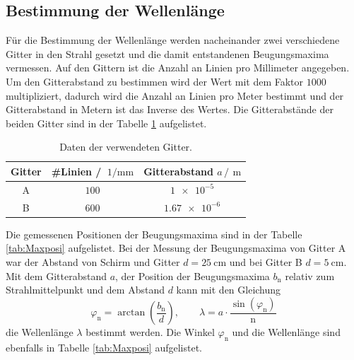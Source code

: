 \subsection{Bestimmung der Wellenlänge}
Für die Bestimmung der Wellenlänge werden nacheinander zwei verschiedene Gitter in den Strahl gesetzt und die damit entstandenen 
Beugungsmaxima vermessen.
Auf den Gittern ist die Anzahl an Linien pro Millimeter angegeben. Um den Gitterabstand zu bestimmen wird der Wert mit dem 
Faktor $\num{1000}$ multipliziert, dadurch wird die Anzahl an Linien pro Meter bestimmt und der Gitterabstand in Metern ist 
das Inverse des Wertes.
Die Gitterabstände der beiden Gitter sind in der Tabelle \ref{tab:Gitterabstand} aufgelistet.
\FloatBarrier
\begin{table}
  \centering
  \caption{Daten der verwendeten Gitter.}
  \label{tab:Gitterabstand}
  \begin{tabular}{c c c}
    \toprule
    Gitter&\#Linien / $\SI{}{1\per\milli\meter}$&Gitterabstand $a\,/\,\SI{}{\meter}$\\
    \midrule
    A&$\num{100}$&$\num{1e-5}$\\
    B&$\num{600}$&$\num{1.67e-6}$\\
    \bottomrule
  \end{tabular}
\end{table}
\FloatBarrier
Die gemessenen Positionen der Beugungsmaxima sind in der Tabelle \ref{tab:Maxposi} aufgelistet. Bei der Messung der 
Beugungsmaxima von Gitter A war der Abstand von Schirm und Gitter $d=\SI{25}{\centi\meter}$ und bei Gitter B $d=\SI{5}{\centi\meter}$.
Mit dem Gitterabstand $a$, der Position der Beugungsmaxima $b_{\text{n}}$ relativ zum Strahlmittelpunkt und dem Abstand $d$ kann mit den
Gleichung 
\begin{equation*}
  \varphi_{\text{n}}=\arctan{\left(\frac{b_{\text{n}}}{d}\right)},\qquad \lambda = a\cdot\frac{\sin{\left(\varphi_{\text{n}}\right)}}{\text{n}}
\end{equation*}
die Wellenlänge $\lambda$ bestimmt werden. Die Winkel $\varphi_{\text{n}}$ und die Wellenlänge sind ebenfalls in Tabelle \ref{tab:Maxposi} aufgelistet.
\FloatBarrier
